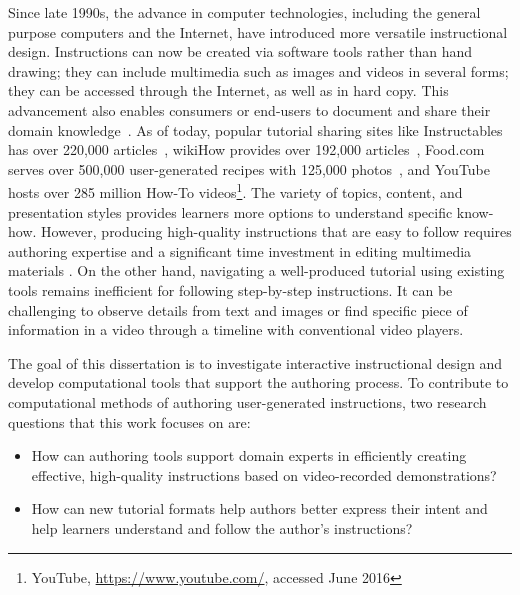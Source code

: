 Since late 1990s, the advance in computer technologies, including the general purpose computers and the Internet, have introduced more versatile instructional design. Instructions can now be created via software tools rather than hand drawing; they can include multimedia such as images and videos in several forms; they can be accessed through the Internet, as well as in hard copy.
%
This advancement also enables consumers or end-users to document and share their domain knowledge~\cite{Lafreniere:2012tl}. As of today, popular tutorial sharing sites like Instructables has over 220,000 articles~\cite{InstructablesProjects}, wikiHow provides over 192,000 articles~\cite{wikiHowStatistics}, Food.com serves over 500,000 user-generated recipes with 125,000 photos~\cite{FoodComAbout}, and YouTube hosts over 285 million How-To videos\footnote{YouTube, \url{https://www.youtube.com/}, accessed June 2016}.
%
The variety of topics, content, and presentation styles provides learners more options to understand specific know-how.
%
However, producing high-quality instructions that are easy to follow requires authoring expertise and a significant time investment in editing multimedia materials \cite{Muller:2009tw}.
%
On the other hand, navigating a well-produced tutorial using existing tools remains inefficient for following step-by-step instructions. It can be challenging to observe details from text and images or find specific piece of information in a video through a timeline with conventional video players.

The goal of this dissertation is to investigate interactive instructional design and develop computational tools that support the authoring process.
%
To contribute to computational methods of authoring user-generated instructions, two research questions that this work focuses on are:
\begin{itemize}
  \item How can authoring tools support domain experts in efficiently creating effective, high-quality instructions based on video-recorded demonstrations?

  \item How can new tutorial formats help authors better express their intent and help learners understand and follow the author's instructions?
\end{itemize}

